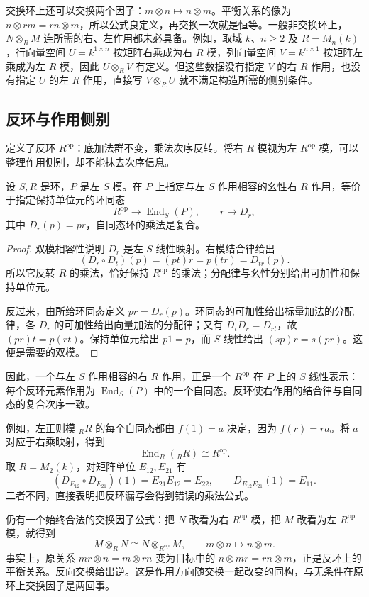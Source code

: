 \ProseParagraphBreak
交换环上还可以交换两个因子：\(m\otimes n\mapsto n\otimes m\)。平衡关系的像为 \(n\otimes rm=rn\otimes m\)，所以公式良定义，再交换一次就是恒等。一般非交换环上，\(N\otimes_RM\) 连所需的右、左作用都未必具备。例如，取域 \(k\)、\(n\ge2\) 及 \(R=M_n(k)\)，行向量空间 \(U=k^{1\times n}\) 按矩阵右乘成为右 \(R\) 模，列向量空间 \(V=k^{n\times1}\) 按矩阵左乘成为左 \(R\) 模，因此 \(U\otimes_RV\) 有定义。但这些数据没有指定 \(V\) 的右 \(R\) 作用，也没有指定 \(U\) 的左 \(R\) 作用，直接写 \(V\otimes_RU\) 就不满足构造所需的侧别条件。

\subsection{反环与作用侧别}
\label{b2:subsec:0602:03}

定义了反环 \(R^{\mathrm{op}}\)：底加法群不变，乘法次序反转。将右 \(R\) 模视为左 \(R^{\mathrm{op}}\) 模，可以整理作用侧别，却不能抹去次序信息。

\begin{proposition}\label{b2:prop:bimodule-opposite-action}
	设 \(S,R\) 是环，\(P\) 是左 \(S\) 模。在 \(P\) 上指定与左 \(S\) 作用相容的幺性右 \(R\) 作用，等价于指定保持单位元的环同态
	\[
		R^{\mathrm{op}}\longrightarrow\operatorname{End}_S(P), \qquad r\longmapsto D_r,
	\]
	其中 \(D_r(p)=pr\)，自同态环的乘法是复合。
\end{proposition}
\begin{proof}
	双模相容性说明 \(D_r\) 是左 \(S\) 线性映射。右模结合律给出
	\[
		(D_r\circ D_t)(p)=(pt)r=p(tr)=D_{tr}(p).
	\]
	所以它反转 \(R\) 的乘法，恰好保持 \(R^{\mathrm{op}}\) 的乘法；分配律与幺性分别给出可加性和保持单位元。

	反过来，由所给环同态定义 \(pr=D_r(p)\)。环同态的可加性给出标量加法的分配律，各 \(D_r\) 的可加性给出向量加法的分配律；又有 \(D_tD_r=D_{rt}\)，故 \((pr)t=p(rt)\)。保持单位元给出 \(p1=p\)，而 \(S\) 线性给出 \((sp)r=s(pr)\)。这便是需要的双模。
\end{proof}

因此，一个与左 \(S\) 作用相容的右 \(R\) 作用，正是一个 \(R^{\mathrm{op}}\) 在 \(P\) 上的 \(S\) 线性表示：每个反环元素作用为 \(\operatorname{End}_S(P)\) 中的一个自同态。反环使右作用的结合律与自同态的复合次序一致。

\ProseParagraphBreak
例如，左正则模 \({}_RR\) 的每个自同态都由 \(f(1)=a\) 决定，因为 \(f(r)=ra\)。将 \(a\) 对应于右乘映射，得到
\[
	\operatorname{End}_R({}_RR)\cong R^{\mathrm{op}}.
\]
取 \(R=M_2(k)\)，对矩阵单位 \(E_{12},E_{21}\) 有
\[
	(D_{E_{12}}\circ D_{E_{21}})(1)=E_{21}E_{12}=E_{22}, \qquad D_{E_{12}E_{21}}(1)=E_{11}.
\]
二者不同，直接表明把反环漏写会得到错误的乘法公式。

\ProseParagraphBreak
仍有一个始终合法的交换因子公式：把 \(N\) 改看为右 \(R^{\mathrm{op}}\) 模，把 \(M\) 改看为左 \(R^{\mathrm{op}}\) 模，就得到
\begin{equation}\label{b2:eq:tensor-opposite-swap}
	M\otimes_RN\cong N\otimes_{R^{\mathrm{op}}}M, \qquad m\otimes n\longmapsto n\otimes m.
\end{equation}
事实上，原关系 \(mr\otimes n=m\otimes rn\) 变为目标中的 \(n\otimes mr=rn\otimes m\)，正是反环上的平衡关系。反向交换给出逆。这是作用方向随交换一起改变的同构，与无条件在原环上交换因子是两回事。
